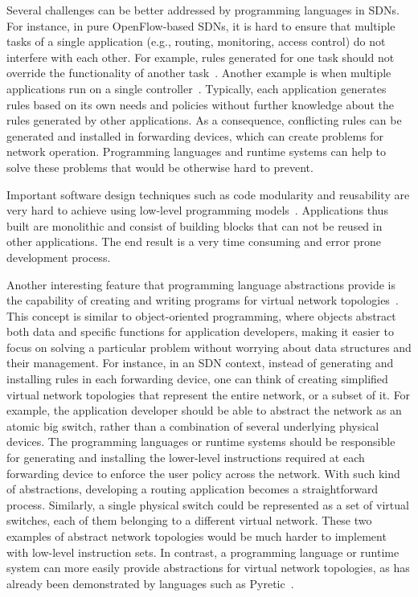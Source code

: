 Several challenges can be better addressed by programming languages in SDNs.
For instance, in pure OpenFlow-based SDNs, it is hard to ensure that multiple tasks of a single application 
(e.g., routing, monitoring, access control) do not interfere with each other.
For example, rules generated for one task should not override the functionality of another task~\cite{foster2011,ferguson2012}.
Another example is when multiple applications run on a single controller~\cite{monsanto2013,ferguson2012,porras2012,shin2013-1,son2013}.
Typically, each application generates rules based on its own needs and policies without further knowledge about the rules generated by other applications. As a consequence, conflicting rules can be generated and installed in forwarding devices, which can create problems for network operation.
Programming languages and runtime systems can help to solve these problems that would be otherwise hard to prevent.

Important software design techniques such as code modularity and reusability are very hard to achieve using low-level programming models~\cite{monsanto2013}.
Applications thus built are monolithic and consist of building blocks that can not be reused in other applications.
The end result is a very time consuming and error prone development process.

Another interesting feature that programming language abstractions provide is the capability of 
creating and writing programs for virtual network topologies~\cite{reich2013,gutz2012}.
This concept is similar to object-oriented programming, where objects abstract both data and specific functions 
for application developers, making it easier to focus on solving a particular problem without worrying about 
data structures and their management. For instance, in an SDN context, instead of generating and installing 
rules in each forwarding device, one can think of creating simplified virtual network topologies that represent 
the entire network, or a subset of it. For example, the application developer should be able to abstract the 
network as an atomic big switch, rather than a combination of several underlying physical devices.
The programming languages or runtime systems should be responsible for generating and installing the lower-level 
instructions required at each forwarding device to enforce the user policy across the network. With such kind of 
abstractions, developing a routing application becomes a straightforward process. Similarly, a single physical 
switch could be represented as a set of virtual switches, each of them belonging to a different virtual network.
These two examples of abstract network topologies would be much harder to implement with low-level 
instruction sets. In contrast, a programming language or runtime system can more easily provide abstractions 
for virtual network topologies, as has already been demonstrated by languages such as Pyretic~\cite{reich2013}.

